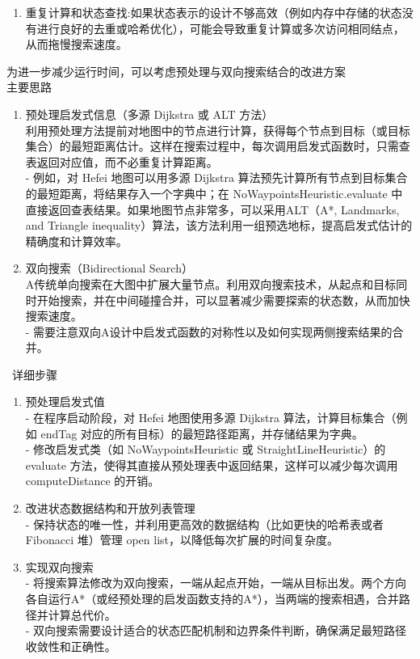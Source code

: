 \documentclass{article}
\begin{document}
\begin{enumerate}[label=(\alph*), start=6]
\begin{enumerate}
    	\item 重复计算和状态查找:如果状态表示的设计不够高效（例如内存中存储的状态没有进行良好的去重或哈希优化），可能会导致重复计算或多次访问相同结点，从而拖慢搜索速度。
    \end{enumerate}
    为进一步减少运行时间，可以考虑预处理与双向搜索结合的改进方案\\
    主要思路
    \begin{enumerate}
    	\item 预处理启发式信息（多源 Dijkstra 或 ALT 方法）\\
    	利用预处理方法提前对地图中的节点进行计算，获得每个节点到目标（或目标集合）的最短距离估计。这样在搜索过程中，每次调用启发式函数时，只需查表返回对应值，而不必重复计算距离。\\
    	- 例如，对 Hefei 地图可以用多源 Dijkstra 算法预先计算所有节点到目标集合的最短距离，将结果存入一个字典中；在 NoWaypointsHeuristic.evaluate 中直接返回查表结果。如果地图节点非常多，可以采用ALT（A*, Landmarks, and Triangle inequality）算法，该方法利用一组预选地标，提高启发式估计的精确度和计算效率。
    	\item 双向搜索（Bidirectional Search）\\
    	A传统单向搜索在大图中扩展大量节点。利用双向搜索技术，从起点和目标同时开始搜索，并在中间碰撞合并，可以显著减少需要探索的状态数，从而加快搜索速度。\\
    	- 需要注意双向A设计中启发式函数的对称性以及如何实现两侧搜索结果的合并。
    \end{enumerate}\
    详细步骤
    \begin{enumerate}
    	\item 预处理启发式值\\
    	- 在程序启动阶段，对 Hefei 地图使用多源 Dijkstra 算法，计算目标集合（例如 endTag 对应的所有目标）的最短路径距离，并存储结果为字典。\\
    	- 修改启发式类（如 NoWaypointsHeuristic 或 StraightLineHeuristic）的 evaluate 方法，使得其直接从预处理表中返回结果，这样可以减少每次调用 computeDistance 的开销。
    	\item 改进状态数据结构和开放列表管理\\
    	- 保持状态的唯一性，并利用更高效的数据结构（比如更快的哈希表或者 Fibonacci 堆）管理 open list，以降低每次扩展的时间复杂度。
    	\item 实现双向搜索\\
    	- 将搜索算法修改为双向搜索，一端从起点开始，一端从目标出发。两个方向各自运行A*（或经预处理的启发函数支持的A*），当两端的搜索相遇，合并路径并计算总代价。\\
    	- 双向搜索需要设计适合的状态匹配机制和边界条件判断，确保满足最短路径收敛性和正确性。
    \end{enumerate}
    
    
    
    
    
    
    
    
\end{enumerate}
\end{document}
